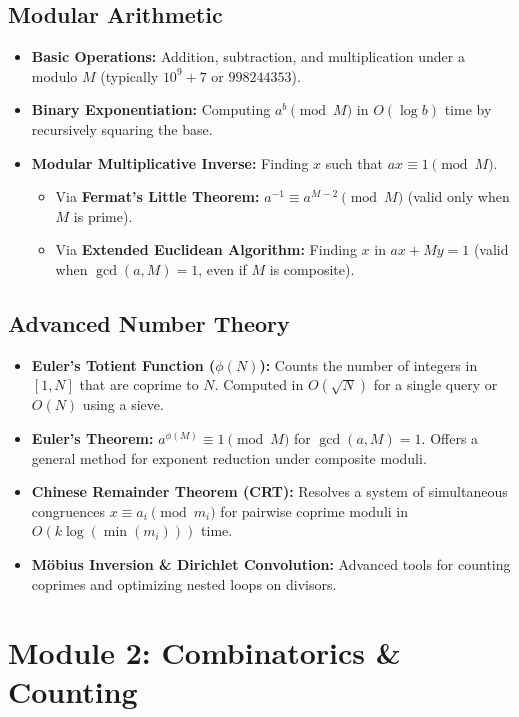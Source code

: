 \documentclass[10pt,journal,compsoc,onecolumn]{IEEEtran}
\begin{document}
\subsection{Modular Arithmetic}
\begin{itemize}
    \item \textbf{Basic Operations:} Addition, subtraction, and multiplication under a modulo $M$ (typically $10^9+7$ or $998244353$).
    \item \textbf{Binary Exponentiation:} Computing $a^b \pmod M$ in $O(\log b)$ time by recursively squaring the base.
    \item \textbf{Modular Multiplicative Inverse:} Finding $x$ such that $ax \equiv 1 \pmod M$.
    \begin{itemize}
        \item Via \textbf{Fermat's Little Theorem:} $a^{-1} \equiv a^{M-2} \pmod M$ (valid only when $M$ is prime).
        \item Via \textbf{Extended Euclidean Algorithm:} Finding $x$ in $ax + My = 1$ (valid when $\gcd(a, M) = 1$, even if $M$ is composite).
    \end{itemize}
\end{itemize}

\subsection{Advanced Number Theory}
\begin{itemize}
    \item \textbf{Euler's Totient Function ($\phi(N)$):} Counts the number of integers in $[1, N]$ that are coprime to $N$. Computed in $O(\sqrt{N})$ for a single query or $O(N)$ using a sieve.
    \item \textbf{Euler's Theorem:} $a^{\phi(M)} \equiv 1 \pmod M$ for $\gcd(a, M) = 1$. Offers a general method for exponent reduction under composite moduli.
    \item \textbf{Chinese Remainder Theorem (CRT):} Resolves a system of simultaneous congruences $x \equiv a_i \pmod{m_i}$ for pairwise coprime moduli in $O(k \log(\min(m_i)))$ time.
    \item \textbf{Möbius Inversion \& Dirichlet Convolution:} Advanced tools for counting coprimes and optimizing nested loops on divisors.
\end{itemize}

\section{Module 2: Combinatorics \& Counting}
\label{sec:combinatorics}
\end{document}
